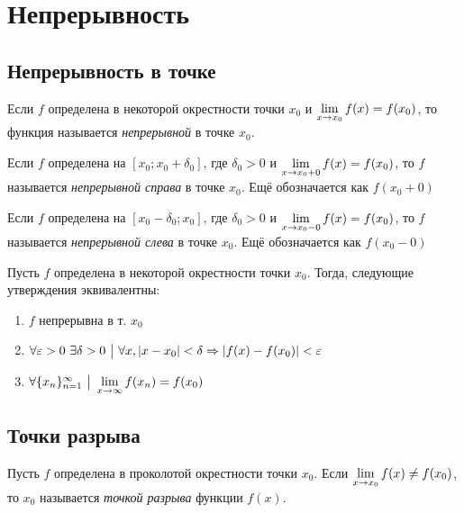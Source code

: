 \section{Непрерывность}

\subsection{Непрерывность в точке}

\begin{definition}
	Если $f$ определена в некоторой окрестности точки $x_0$ и $\lim\limits_{x \to x_0} f(x) = f(x_0)$, то функция называется \textit{непрерывной} в точке $x_0$.
\end{definition}

\begin{definition}
	Если $f$ определена на $[x_0; x_0 + \delta_0]$, где $\delta_0 > 0$ и $\lim\limits_{x \to x_0 + 0} f(x) = f(x_0)$, то $f$ называется \textit{непрерывной справа} в точке $x_0$. Ещё обозначается как $f(x_0 + 0)$
\end{definition}

\begin{definition}
	Если $f$ определена на $[x_0 - \delta_0; x_0]$, где $\delta_0 > 0$ и $\lim\limits_{x \to x_0 - 0} f(x) = f(x_0)$, то $f$ называется \textit{непрерывной слева} в точке $x_0$. Ещё обозначается как $f(x_0 - 0)$
\end{definition}

\begin{theorem}
	Пусть $f$ определена в некоторой окрестности точки $x_0$. Тогда, следующие утверждения эквивалентны:
	\begin{enumerate}
		\item $f$ непрерывна в т. $x_0$
		\item $\forall \varepsilon > 0\ \exists \delta > 0 \ \big|\  \forall x, |x - x_0| < \delta \Rightarrow |f(x) - f(x_0)| < \varepsilon$
		\item $\forall \{x_n\}_{n = 1}^\infty \ \big|\  \lim\limits_{x \to \infty} f(x_n) = f(x_0)$
	\end{enumerate}
\end{theorem}

\subsection{Точки разрыва}

\begin{definition}
	Пусть $f$ определена в проколотой окрестности точки $x_0$. Если $\lim\limits_{x \to x_0} f(x) \neq f(x_0)$, то $x_0$ называется \textit{точкой разрыва} функции $f(x)$.
\end{definition}

